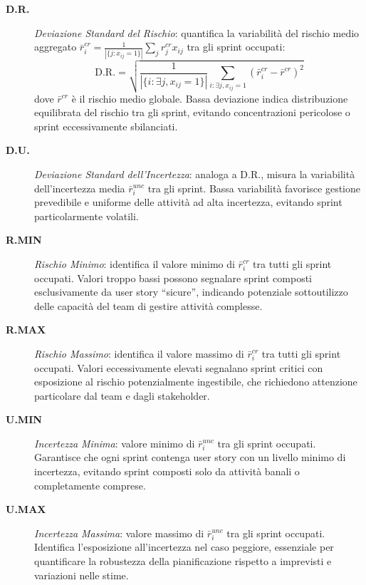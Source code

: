 \documentclass[12pt,a4paper,openright,twoside]{book}
\begin{document}
\begin{description}
    \item[\textbf{D.R.}] \emph{Deviazione Standard del Rischio}: quantifica la variabilità del rischio medio aggregato $\bar{r}_i^{cr} = \frac{1}{|\{j : x_{ij}=1\}|} \sum_j r_j^{cr} x_{ij}$ tra gli sprint occupati:
    \[
    \text{D.R.} = \sqrt{\frac{1}{|\{i : \exists j, x_{ij} = 1\}|} \sum_{i : \exists j, x_{ij} = 1} (\bar{r}_i^{cr} - \bar{r}^{cr})^2}
    \]
    dove $\bar{r}^{cr}$ è il rischio medio globale. Bassa deviazione indica distribuzione equilibrata del rischio tra gli sprint, evitando concentrazioni pericolose o sprint eccessivamente sbilanciati.
    
    \item[\textbf{D.U.}] \emph{Deviazione Standard dell'Incertezza}: analoga a D.R., misura la variabilità dell'incertezza media $\bar{r}_i^{unc}$ tra gli sprint. Bassa variabilità favorisce gestione prevedibile e uniforme delle attività ad alta incertezza, evitando sprint particolarmente volatili.
    
    \item[\textbf{R.MIN}] \emph{Rischio Minimo}: identifica il valore minimo di $\bar{r}_i^{cr}$ tra tutti gli sprint occupati. Valori troppo bassi possono segnalare sprint composti esclusivamente da user story ``sicure'', indicando potenziale sottoutilizzo delle capacità del team di gestire attività complesse.
    
    \item[\textbf{R.MAX}] \emph{Rischio Massimo}: identifica il valore massimo di $\bar{r}_i^{cr}$ tra tutti gli sprint occupati. Valori eccessivamente elevati segnalano sprint critici con esposizione al rischio potenzialmente ingestibile, che richiedono attenzione particolare dal team e dagli stakeholder.
    
    \item[\textbf{U.MIN}] \emph{Incertezza Minima}: valore minimo di $\bar{r}_i^{unc}$ tra gli sprint occupati. Garantisce che ogni sprint contenga user story con un livello minimo di incertezza, evitando sprint composti solo da attività banali o completamente comprese.
    
    \item[\textbf{U.MAX}] \emph{Incertezza Massima}: valore massimo di $\bar{r}_i^{unc}$ tra gli sprint occupati. Identifica l'esposizione all'incertezza nel caso peggiore, essenziale per quantificare la robustezza della pianificazione rispetto a imprevisti e variazioni nelle stime.
\end{description}
\end{document}
